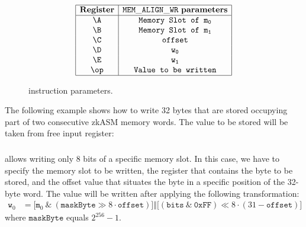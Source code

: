 \begin{figure}[h!]
    \renewcommand{\figurename}{Table}
    \[
    \begin{array}{|c|c|}
        \hline
        \mathbf{Register} &\mathtt{MEM\_ALIGN\_WR} \ \mathbf{parameters} \\ \hline
        \A & \texttt{Memory Slot of } \mathtt{m_0}  \\
        \B & \texttt{Memory Slot of } \mathtt{m_1}  \\
        \C & \mathtt{offset} \\
        \D & \mathtt{w_0} \\
        \E & \mathtt{w_1} \\
        \op& \texttt{Value to be written} \\
        \hline
    \end{array}
    \]
    \caption{\MEMALIGNWR instruction parameters.}
    \label{tab:memory-first-example}
\end{figure}

The following example shows how to write 32 bytes that are stored occupying part of two consecutive zkASM memory words. The value to be stored will be taken from free input register:


\subsubsection{\MEMALIGNWRE}

\MEMALIGNWRE allows writing only 8 bits of a specific memory slot. In this case, we have to specify the memory slot to be written, the register that contains the byte to be stored, and the offset value that situates the byte in a specific position of the 32-byte word. The value will be written after applying the following transformation:
\begin{align*}
    \texttt{w}_0 &= \Bigr[ \texttt{m}_0 \ \texttt{\&} \ \left( \texttt{maskByte} \gg 8 \cdot \texttt{offset} \right) \Bigr]  \mathbin\Vert \Bigr[ \left( \texttt{bits} \ \texttt{\&} \ \texttt{0xFF} \right)  \ll 8 \cdot \left( 31-\texttt{offset}\right) \Bigr] 
\end{align*}
where $\texttt{maskByte}$ equals $2^{256} - 1$. 

